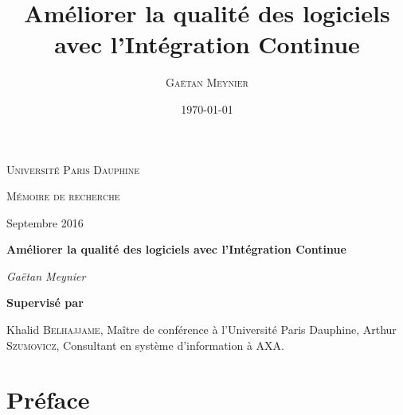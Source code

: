 \documentclass{report}
\title{Améliorer la qualité des logiciels avec l'Intégration Continue}
\author{\textsc{Gaëtan Meynier}}
\date{\today}
\begin{document}
  \begin{titlepage}
    \centering
    {\scshape\LARGE Université Paris Dauphine \par}
    \vspace{1cm}
	  {\scshape\Large Mémoire de recherche\par}
    \vspace{0.5cm}
    Septembre 2016\par
    \vspace{4.5cm}
    {\huge\bfseries Améliorer la qualité des logiciels avec l'Intégration Continue\par}
    \vspace{2cm}
	  {\Large\itshape Gaëtan Meynier\par}
    \vspace{5cm}
	  \vfill
	    {\bfseries Supervisé par\par}
      \vspace{0.5cm}
	    Khalid \textsc{Belhajjame}, Maître de conférence à l'Université Paris Dauphine,
      Arthur \textsc{Szumovicz}, Consultant en système d'information à AXA.
	  \vfill
  \end{titlepage}

  \tableofcontents                %

  \chapter{Préface}
\end{document}
